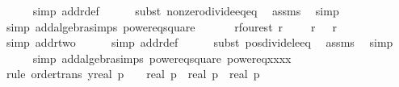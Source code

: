 \begin{isabellebody}
\ \ \ \ \isamarkupfalse%
\ {\isacharparenleft}{\kern0pt}simp\ add{\isacharcolon}{\kern0pt}r{\isacharunderscore}{\kern0pt}def{\isacharparenright}{\kern0pt}\isanewline
\ \ \ \ \isamarkupfalse%
\ {\isacharparenleft}{\kern0pt}subst\ nonzero{\isacharunderscore}{\kern0pt}divide{\isacharunderscore}{\kern0pt}eq{\isacharunderscore}{\kern0pt}eq{\isacharparenright}{\kern0pt}\ \isamarkupfalse%
\ assms\ \isamarkupfalse%
\ simp\isanewline
\ \ \ \ \isamarkupfalse%
\ {\isacharparenleft}{\kern0pt}simp\ add{\isacharcolon}{\kern0pt}algebra{\isacharunderscore}{\kern0pt}simps\ power{}{\isacharunderscore}{\kern0pt}eq{\isacharunderscore}{\kern0pt}square{\isacharparenright}{\kern0pt}\isanewline
\isanewline
\ \ \isanewline
\ \ \isamarkupfalse%
\ r{\isacharunderscore}{\kern0pt}four{\isacharunderscore}{\kern0pt}est{\isacharcolon}{\kern0pt}\ {\isachardoublequoteopen}r\ {}\ {\isasymle}\ {}\ {\isacharasterisk}{\kern0pt}\ r\ {}\ {\isacharasterisk}{\kern0pt}\ r\ {}{\isachardoublequoteclose}\ \isanewline
\ \ \ \ \isamarkupfalse%
\ {\isacharparenleft}{\kern0pt}simp\ add{\isacharcolon}{\kern0pt}r{\isacharunderscore}{\kern0pt}two{\isacharparenright}{\kern0pt}\isanewline
\ \ \ \ \isamarkupfalse%
\ {\isacharparenleft}{\kern0pt}simp\ add{\isacharcolon}{\kern0pt}r{\isacharunderscore}{\kern0pt}def{\isacharparenright}{\kern0pt}\isanewline
\ \ \ \ \isamarkupfalse%
\ {\isacharparenleft}{\kern0pt}subst\ pos{\isacharunderscore}{\kern0pt}divide{\isacharunderscore}{\kern0pt}le{\isacharunderscore}{\kern0pt}eq{\isacharparenright}{\kern0pt}\ \isamarkupfalse%
\ assms\ \isamarkupfalse%
\ simp\isanewline
\ \ \ \ \isamarkupfalse%
\ {\isacharparenleft}{\kern0pt}simp\ add{\isacharcolon}{\kern0pt}algebra{\isacharunderscore}{\kern0pt}simps\ power{}{\isacharunderscore}{\kern0pt}eq{\isacharunderscore}{\kern0pt}square\ power{}{\isacharunderscore}{\kern0pt}eq{\isacharunderscore}{\kern0pt}xxxx{\isacharparenright}{\kern0pt}\isanewline
\ \ \ \ \isamarkupfalse%
\ {\isacharparenleft}{\kern0pt}rule\ order{\isacharunderscore}{\kern0pt}trans{\isacharbrackleft}{\kern0pt}\ y{\isacharequal}{\kern0pt}{\isachardoublequoteopen}real\ p\ {\isacharasterisk}{\kern0pt}\ {}{}\ {\isacharplus}{\kern0pt}\ real\ p\ {\isacharasterisk}{\kern0pt}\ {\isacharparenleft}{\kern0pt}real\ p\ {\isacharasterisk}{\kern0pt}\ {\isacharparenleft}{\kern0pt}real\ p\ {\isacharasterisk}{\kern0pt}\ {}{}{\isacharparenright}{\kern0pt}{\isacharparenright}{\kern0pt}{\isachardoublequoteclose}{\isacharbrackright}{\kern0pt}{\isacharparenright}{\kern0pt}\isanewline

\end{isabellebody}
